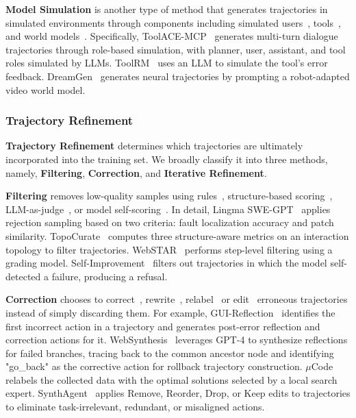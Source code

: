 \documentclass{llmxive}
\begin{document}
\textbf{Model Simulation} is another type of method that generates trajectories in simulated environments through components including simulated users~\cite{APIGen-MT, AgentScaler,ToolACE-MCP}, tools~\cite{ToolAlpaca,ToolACE,ToolRM,MagicAgent}, and world models~\cite{DreamGen, WebSynthesis}. Specifically, ToolACE-MCP~\cite{ToolACE-MCP} generates multi-turn dialogue trajectories through role-based simulation, with planner, user, assistant, and tool roles simulated by LLMs. ToolRM~\cite{ToolRM} uses an LLM to simulate the tool’s error feedback. DreamGen~\cite{DreamGen} generates neural trajectories by prompting a robot-adapted video world model. 

\subsubsection{Trajectory Refinement}
\label{sec:trajectory_refinement}
\textbf{Trajectory Refinement} determines which trajectories are ultimately incorporated into the training set. We broadly classify it into three methods, namely, \textbf{Filtering}, \textbf{Correction}, and \textbf{Iterative Refinement}.


\textbf{Filtering} removes low-quality samples using rules~\cite{Toolformer,Lingma_SWE-GPT,SimpleDeepSearcher, WebResearcher, WebLeaper}, structure-based scoring~\cite{TopoCurate}, LLM-as-judge~\cite{OS-Genesis, Insta, MaskSearch, WebSTAR, Agent-Reward, AutoPlay}, or model self-scoring~\cite{Self-Improvement}. In detail, Lingma SWE-GPT~\cite{Lingma_SWE-GPT} applies rejection sampling based on two criteria: fault localization accuracy and patch similarity. TopoCurate~\cite{TopoCurate} computes three structure-aware metrics on an interaction topology to filter trajectories.  WebSTAR~\cite{WebSTAR} performs step-level filtering using a grading model. Self-Improvement~\cite{Self-Improvement} filters out trajectories in which the model self-detected a failure, producing a refusal.

\textbf{Correction} chooses to correct~\cite{GUI-Reflection,AgentFounder}, rewrite~\cite{ToolRM,UI-Venus-1.5,HATS}, relabel~\cite{muCode} or edit~\cite{SynthAgent} erroneous trajectories instead of simply discarding them. 
For example, GUI-Reflection~\cite{GUI-Reflection} identifies the first incorrect action in a trajectory and generates post-error reflection and correction actions for it. WebSynthesis~\cite{WebSynthesis} leverages GPT-4 to synthesize reflections for failed branches, tracing back to the common ancestor node and identifying "go\_back" as the corrective action for rollback trajectory construction. $\mu$Code~\cite{muCode} relabels the collected data with the optimal solutions selected by a local search expert. SynthAgent~\cite{SynthAgent} applies Remove, Reorder, Drop, or Keep edits to trajectories to eliminate task-irrelevant, redundant, or misaligned actions.
\end{document}
